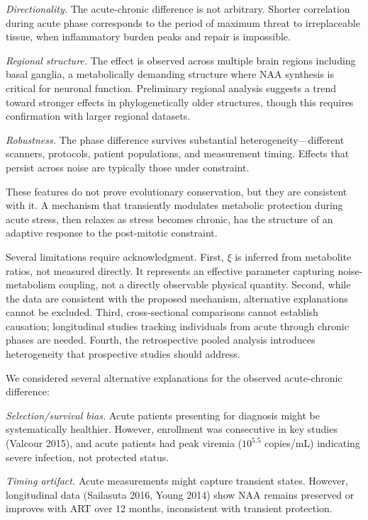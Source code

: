 \documentclass[10pt,a4paper]{article}
\begin{document}
\textit{Directionality.} The acute-chronic difference is not arbitrary. Shorter correlation during acute phase corresponds to the period of maximum threat to irreplaceable tissue, when inflammatory burden peaks and repair is impossible.

\textit{Regional structure.} The effect is observed across multiple brain regions including basal ganglia, a metabolically demanding structure where NAA synthesis is critical for neuronal function. Preliminary regional analysis suggests a trend toward stronger effects in phylogenetically older structures, though this requires confirmation with larger regional datasets.

\textit{Robustness.} The phase difference survives substantial heterogeneity---different scanners, protocols, patient populations, and measurement timing. Effects that persist across noise are typically those under constraint.

These features do not prove evolutionary conservation, but they are consistent with it. A mechanism that transiently modulates metabolic protection during acute stress, then relaxes as stress becomes chronic, has the structure of an adaptive response to the post-mitotic constraint.

Several limitations require acknowledgment. First, $\xi$ is inferred from metabolite ratios, not measured directly. It represents an effective parameter capturing noise-metabolism coupling, not a directly observable physical quantity. Second, while the data are consistent with the proposed mechanism, alternative explanations cannot be excluded. Third, cross-sectional comparisons cannot establish causation; longitudinal studies tracking individuals from acute through chronic phases are needed. Fourth, the retrospective pooled analysis introduces heterogeneity that prospective studies should address.

We considered several alternative explanations for the observed acute-chronic difference:

\textit{Selection/survival bias.} Acute patients presenting for diagnosis might be systematically healthier. However, enrollment was consecutive in key studies (Valcour 2015), and acute patients had peak viremia ($10^{5.5}$ copies/mL) indicating severe infection, not protected status.

\textit{Timing artifact.} Acute measurements might capture transient states. However, longitudinal data (Sailasuta 2016, Young 2014) show NAA remains preserved or improves with ART over 12 months, inconsistent with transient protection.
\end{document}
